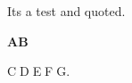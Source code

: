 \documentclass{article}
\begin{document}
Its a test and quoted.

\textbf{AB}

C^^AD^^KE^^ZF^^_G.
\end{document}
